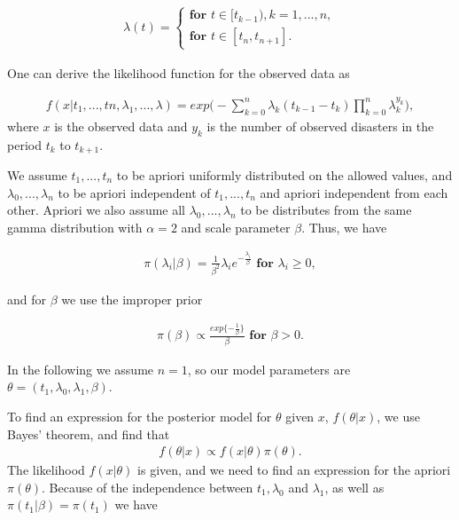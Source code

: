 \begin{align}
    \lambda(t) = 
    \begin{cases}
        \textbf{for } t \in [t_{k-1}), k = 1,...,n, \\
        \textbf{for } t \in [t_n, t_{n+1}].
    \end{cases}
\end{align}

One can derive the likelihood function for the observed data as

\begin{align}
    f(x|t_1,...,tn,\lambda_1,...,\lambda) 
    = exp \Big( - \sum_{k = 0}^n \lambda_k (t_{k-1} - t_k) \prod_{k = 0}^n \lambda_k^{y_k} \Big), 
\end{align}
where $x$ is the observed data and $y_k$ is the number of observed disasters in the period $t_k$ to $t_{k+1}$. 

We assume $t_1,...,t_n$ to be apriori uniformly distributed on the allowed values, and $\lambda_0,...,\lambda_n$ to be apriori independent of $t_1,...,t_n$ and apriori independent from each other. Apriori we also assume all $\lambda_0,...,\lambda_n$ to be distributes from the same gamma distribution with $\alpha = 2$ and scale parameter $\beta$. Thus, we have 

\begin{align}
    \pi(\lambda_i | \beta) = \frac{1}{\beta^2}\lambda_i e^{-\frac{\lambda_i}{\beta}} \textbf{ for } \lambda_i \geq 0,
\end{align}

and for $\beta$ we use the improper prior 

\begin{align}
    \pi (\beta) \propto \frac{exp\{ -\frac{1}{\beta} \} }{\beta} \textbf{ for } \beta > 0.
\end{align}

In the following we assume $n = 1$, so our model parameters are $\theta = (t_1, \lambda_0, \lambda_1, \beta)$. 

To find an expression for the posterior model for $\theta$ given $x$, $f(\theta|x)$, we use Bayes' theorem, and find that 
\begin{align}
    f(\theta|x) \propto f(x|\theta) \pi(\theta).
\end{align}
The likelihood $f(x | \theta)$ is given, and we need to find an expression for the apriori $\pi(\theta)$. Because of the independence between $t_1, \lambda_0$ and $\lambda_1$, as well as $\pi(t_1|\beta) = \pi(t_1)$ we have

